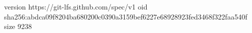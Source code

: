 version https://git-lfs.github.com/spec/v1
oid sha256:abdca09f8204ba680200c0390a3159bef6227e68928923fed3468f322faa540f
size 9238
